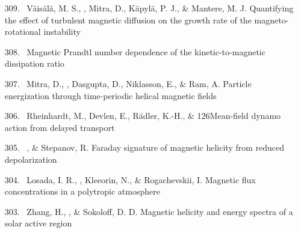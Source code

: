 \begin{itemize}
\item[{309.}~]
V\"ais\"al\"a, M. S., \Brandenburg, Mitra, D., K\"apyl\"a, P. J., \& Mantere, M. J.
{Quantifying the effect of turbulent magnetic diffusion on the growth rate of the magneto-rotational instability}

\item[{308.}~]
\Brandenburg{}
{Magnetic Prandtl number dependence of the kinetic-to-magnetic dissipation ratio}

\item[{307.}~]
Mitra, D., \Brandenburg, Dasgupta, D., Niklasson, E., \& Ram, A.
{Particle energization through time-periodic helical magnetic fields}

\item[{306.}~]
Rheinhardt, M., Devlen, E., R\"adler, K.-H., \& \Brandenburg{}
{126}{Mean-field dynamo action from delayed transport}

\item[{305.}~]
\Brandenburg, \& Stepanov, R.
{Faraday signature of magnetic helicity from reduced depolarization}

\item[{304.}~]
Losada, I. R., \Brandenburg, Kleeorin, N., \& Rogachevskii, I.
{Magnetic flux concentrations in a polytropic atmosphere}

\item[{303.}~]
Zhang, H., \Brandenburg, \& Sokoloff, D. D.
{Magnetic helicity and energy spectra of a solar active region}


\end{itemize}
